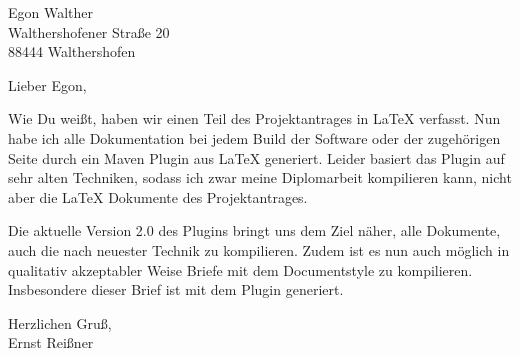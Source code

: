 \documentclass[english,german,a4paper,fontsize=10pt,version=last]{scrlttr2}
\begin{document}
\begin{letter}{Egon Walther \\ Walthershofener Straße 20 \\ 88444 Walthershofen} 
  \opening{Lieber Egon,}

  Wie Du weißt, haben wir einen Teil des Projektantrages in \LaTeX{} verfasst. 
  Nun habe ich alle Dokumentation bei jedem \foreignlanguage{english}{Build} 
  der Software oder der zugehörigen Seite durch ein \foreignlanguage{english}{Maven Plugin} aus \LaTeX{} generiert. 
  Leider basiert das \foreignlanguage{english}{Plugin} auf sehr alten Techniken, 
  sodass ich zwar meine Diplomarbeit kompilieren kann, 
  nicht aber die \LaTeX{} Dokumente des Projektantrages. 

  Die aktuelle Version 2.0 des Plugins bringt uns dem Ziel näher, 
  alle Dokumente, auch die nach neuester Technik zu kompilieren. 
  Zudem ist es nun auch möglich in qualitativ akzeptabler Weise 
  Briefe mit dem \foreignlanguage{english}{Documentstyle} zu kompilieren. 
  Insbesondere dieser Brief ist mit dem Plugin generiert. 
  


  \closing{Herzlichen Gruß, \\[2\baselineskip]Ernst Reißner }

\end{letter}

%
\end{document}
